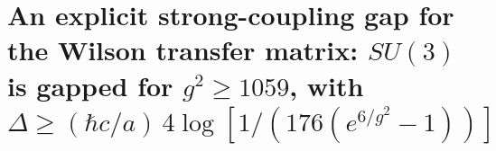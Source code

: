 \documentclass[11pt,a4paper]{article}
\begin{document}
\hypertarget{an-explicit-strong-coupling-gap-for-the-wilson-transfer-matrix-su3-is-gapped-for-g2ge1059-with-deltagehbar-ca4log1176e6g2-1}{%
\section{\texorpdfstring{An explicit strong-coupling gap for the Wilson
transfer matrix: \(SU(3)\) is gapped for \(g^2\ge1059\), with
\(\Delta\ge(\hbar c/a)\,4\log[1/(176(e^{6/g^2}-1))]\)}{An explicit strong-coupling gap for the Wilson transfer matrix: SU(3) is gapped for g\^{}2\textbackslash ge1059, with \textbackslash Delta\textbackslash ge(\textbackslash hbar c/a)\textbackslash,4\textbackslash log{[}1/(176(e\^{}\{6/g\^{}2\}-1)){]}}}\label{an-explicit-strong-coupling-gap-for-the-wilson-transfer-matrix-su3-is-gapped-for-g2ge1059-with-deltagehbar-ca4log1176e6g2-1}}
\end{document}
